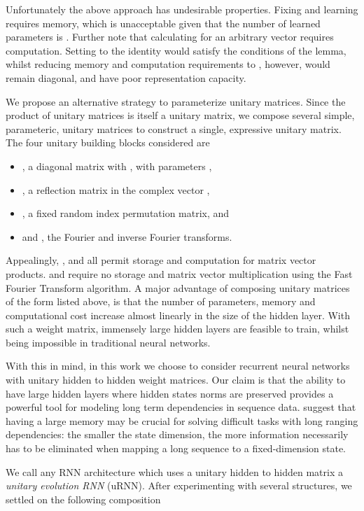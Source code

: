 \documentclass{article}
\begin{document}
Unfortunately the above approach has undesirable properties. 
Fixing  and learning  requires  memory, 
which is unacceptable given that the number of learned parameters is . 
Further note that calculating  for an arbitrary vector  
requires  computation. 
Setting  to the identity would satisfy the conditions of the lemma, whilst reducing  
memory and computation requirements to , however,  would remain diagonal, 
and have poor representation capacity.

We propose an alternative strategy to parameterize unitary matrices. 
Since the product of unitary matrices is itself a unitary matrix, we 
compose several simple, parameteric, unitary matrices to construct a single, expressive unitary matrix.
The four unitary building blocks considered are 

\begin{itemize}
  \item , a diagonal matrix with , with parameters ,
  \item , a reflection matrix in the complex vector 
  , 
  \item , a fixed random index permutation matrix, and
  \item  and , the Fourier and inverse Fourier transforms.
\end{itemize}

Appealingly, ,  and  all permit  storage and 
 computation for matrix vector products.  and 
require no storage and  matrix vector multiplication using the Fast Fourier
Transform algorithm. A major advantage of composing unitary matrices of the form listed above, is 
that the number of parameters, memory and computational cost increase almost linearly in the size
of the hidden layer. With such a weight matrix, immensely large hidden layers are feasible to train, 
whilst being impossible in traditional neural networks. 
 
With this in mind, in this work we choose to consider recurrent neural networks with unitary hidden to hidden
weight matrices. Our claim is that the ability to have large hidden layers where hidden 
states norms are preserved provides a powerful tool for modeling long term dependencies in sequence data. 
\cite{Yoshua94} suggest that having a large memory may be crucial for solving 
difficult tasks with long ranging dependencies: the smaller the state dimension, the more
information necessarily has to be eliminated when mapping a long sequence to a fixed-dimension state.

We call any RNN architecture which uses a unitary hidden to hidden matrix a \textit{unitary evolution RNN}
(uRNN). After experimenting with several structures, we settled on the following composition
\vspace{-0.25mm}
\end{document}
